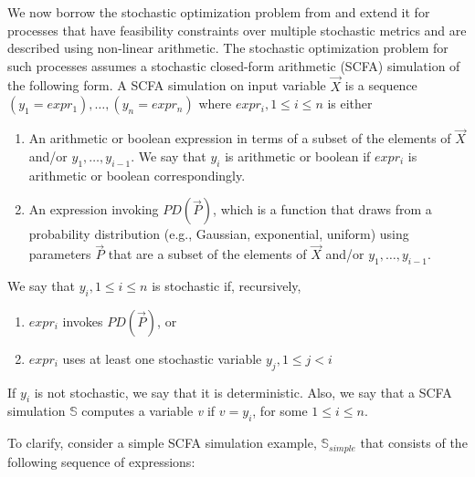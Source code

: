 \documentclass[a4paper, 12pt]{article} %
\begin{document}
We now borrow the stochastic optimization problem from \cite{GMU-CS-TR-2017-3} and extend it for  processes that have feasibility constraints over multiple stochastic metrics and are described using non-linear arithmetic.
The stochastic optimization problem for such processes assumes a stochastic closed-form arithmetic (SCFA) simulation of the following form.
A SCFA simulation on input variable $\vec{X}$ is a sequence $(y_1=expr_1),\dots,(y_n=expr_n)$
\newline where $expr_i, 1\le i \le n$ is either
\begin{enumerate}[label=(\alph*)]
	\item An arithmetic or boolean expression in terms of a subset of the elements of $\vec{X}$ and/or $y_1,\dots,y_{i-1}$. We say that $y_i$ is arithmetic or boolean if $expr_i$ is arithmetic or boolean correspondingly.
	\item An expression invoking $PD(\vec{P})$, which is a function that draws from a probability distribution (e.g., Gaussian, exponential, uniform) using parameters $\vec{P}$ that are a subset of the elements of $\vec{X}$ and/or $y_1,\dots,y_{i-1}$.
\end{enumerate}
We say that $y_i, 1\le i \le n$ is stochastic if, recursively,
\begin{enumerate}[label=(\alph*)]
	\item $expr_i$ invokes $PD(\vec{P})$, or
	\item $expr_i$ uses at least one stochastic variable $y_j, 1\le j < i$
\end{enumerate}
If $y_i$ is not stochastic, we say that it is deterministic.
Also, we say that a SCFA simulation $\mathbb{S}$  computes a variable \textit{v} if $v=y_i$, for some $1\le i \le n$.

\noindent To clarify, consider a simple SCFA simulation example, $\mathbb{S}_{simple}$ that consists of the following sequence of expressions: 
\end{document}
